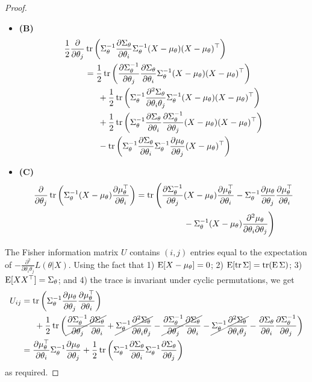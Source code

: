 \begin{proof}
\begin{itemize}
  \item \textbf{(B)}
  \begin{align*}
    \half \frac{\partial}{\partial \theta_j}  
    &\tr \left( 
    \Sigma_\theta^{-1} \dSi \Sigma_\theta^{-1} \Xmu\Xmu^\top 
    \right)  \\
    &= \half \tr \left( 
    \dSjnv \dSi \Sigma_\theta^{-1} \Xmu\Xmu^\top
    \right) \\
    &\phantom{==} +\half \tr \left( 
    \Sigma_\theta^{-1} \dStwo \Sigma_\theta^{-1} \Xmu\Xmu^\top
    \right) \\
    &\phantom{==} +\half \tr \left( 
    \Sigma_\theta^{-1} \dSi \dSjnv \Xmu\Xmu^\top
    \right) \\
    &\phantom{==} - \tr \left( 
    \Sigma_\theta^{-1} \dSi \Sigma_\theta^{-1} \dmuj\Xmu^\top
    \right)
  \end{align*}
  
  \item \textbf{(C)}
  \begin{align*}
    \frac{\partial}{\partial \theta_j}  \tr \left( 
    \Sigma_\theta^{-1}\Xmu\dmuitop 
    \right) 
    &= \tr \Bigg( 
    \dSjnv \Xmu\dmuitop 
    -
    \Sigma_\theta^{-1} \dmuj \dmuitop \\
    &\hspace{2cm} - \Sigma_\theta^{-1}\Xmu\dmutwo \Bigg)
  \end{align*}
\end{itemize}

The Fisher information matrix $U$ contains $(i,j)$ entries equal to the expectation of $-\frac{\partial^2}{\partial \theta_i\theta_j} L(\theta|X)$. 
Using the fact that 1) $\E[X-\mu_\theta]=0$; 2) $\E [\tr \Sigma] = \tr (\E \Sigma)$; 3) $\E [XX^\top] = \Sigma_\theta$; and 4) the trace is invariant under cyclic permutations, we get
\begin{align*}
  U_{ij} 
  &= \tr \left( \Sigma_\theta^{-1} \dmuj \dmuitop \right)   \\
  &\phantom{==} + \half \tr \left( 
  \cancel{\dSjnv \dSi} + \cancel{\Sigma_\theta^{-1}\dStwo}
  - \cancel{\dSjnv \dSi}  - \cancel{\Sigma_\theta^{-1}\dStwo} -  \dSi\dSjnv \right) \\
  &=  \dmuitop \Sigma_\theta^{-1} \dmuj + \half \tr \left(\Sigma_\theta^{-1} \dSi \Sigma_\theta^{-1} \dSj \right)
\end{align*}
as required.  \qedhere

\end{proof}















